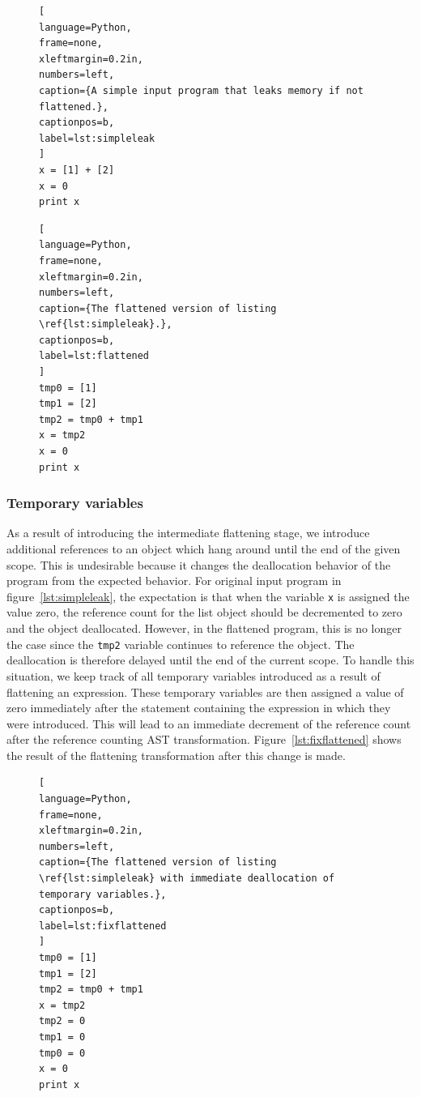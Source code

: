 \documentclass{sigplanconf}
\begin{document}
\begin{figure}[h!]
\begin{lstlisting}[
language=Python,
frame=none,
xleftmargin=0.2in,
numbers=left,
caption={A simple input program that leaks memory if not flattened.},
captionpos=b,
label=lst:simpleleak
]
x = [1] + [2]
x = 0
print x
\end{lstlisting}
\end{figure}

\begin{figure}[h!]
\begin{lstlisting}[
language=Python,
frame=none,
xleftmargin=0.2in,
numbers=left,
caption={The flattened version of listing \ref{lst:simpleleak}.},
captionpos=b,
label=lst:flattened
]
tmp0 = [1]
tmp1 = [2]
tmp2 = tmp0 + tmp1
x = tmp2
x = 0
print x
\end{lstlisting}
\end{figure}

\subsubsection{Temporary variables}
As a result of introducing the intermediate flattening stage, we introduce additional references to an object which hang around until the end of the given scope.  This is undesirable because it changes the deallocation behavior of the program from the expected behavior.  For original input program in figure~\ref{lst:simpleleak}, the expectation is that when the variable \texttt{x} is assigned the value zero, the reference count for the list object should be decremented to zero and the object deallocated.  However, in the flattened program, this is no longer the case since the \texttt{tmp2} variable continues to reference the object.  The deallocation is therefore delayed until the end of the current scope.  To handle this situation, we keep track of all temporary variables introduced as a result of flattening an expression.  These temporary variables are then assigned a value of zero immediately after the statement containing the expression in which they were introduced.  This will lead to an immediate decrement of the reference count after the reference counting AST transformation.  Figure~\ref{lst:fixflattened} shows the result of the flattening transformation after this change is made.

\begin{figure}[h!]
\begin{lstlisting}[
language=Python,
frame=none,
xleftmargin=0.2in,
numbers=left,
caption={The flattened version of listing \ref{lst:simpleleak} with immediate deallocation of temporary variables.},
captionpos=b,
label=lst:fixflattened
]
tmp0 = [1]
tmp1 = [2]
tmp2 = tmp0 + tmp1
x = tmp2
tmp2 = 0
tmp1 = 0
tmp0 = 0
x = 0
print x
\end{lstlisting}
\end{figure}
\end{document}
